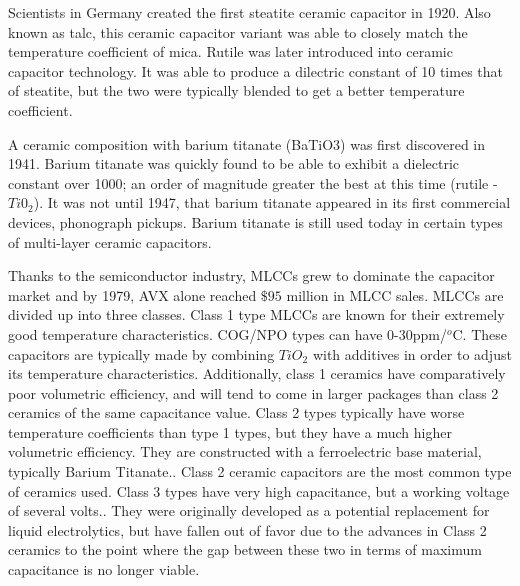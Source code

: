 Scientists in Germany created the first steatite ceramic capacitor in 1920. \cite[Ch 3 Sec II]{cerMaterials} \cite{cerDie} Also known as talc, this ceramic capacitor variant was able to closely match the temperature coefficient of mica.\cite{steatite_hf} Rutile was later introduced into ceramic capacitor technology. It was able to produce a dilectric constant of 10 times that of steatite, but the two were typically blended to get a better temperature coefficient. 

A ceramic composition with barium titanate (BaTiO3) was first discovered in 1941. Barium titanate was quickly found to be able to exhibit a dielectric constant over 1000; an order of magnitude greater the best at this time (rutile - $Ti0_2$). It was not until 1947, that barium titanate appeared in its first commercial devices, phonograph pickups.\cite{piezCer}\cite{hist_cerFilt}\cite[Ch 3 Sec III]{cerMaterials} Barium titanate is still used today in certain types of multi-layer ceramic capacitors.

Thanks to the semiconductor industry, MLCCs grew to dominate the capacitor market and by 1979, AVX alone reached $\$95$ million in MLCC sales.\cite{avx_hist}
MLCCs are divided up into three classes. Class 1 type MLCCs are known for their extremely good temperature characteristics. COG/NPO types can have 0-30ppm/$^o$C. These capacitors are typically made by combining $TiO_2$ with additives in order to adjust its temperature characteristics\cite{intro_cerCaps}. Additionally, class 1 ceramics have comparatively poor volumetric efficiency, and will tend to come in larger packages than class 2 ceramics of the same capacitance value. Class 2 types typically have worse temperature coefficients than type 1 types, but they have a much higher volumetric efficiency. They are constructed with a ferroelectric base material, typically Barium Titanate.\cite{intro_cerCaps}. Class 2 ceramic capacitors are the most common type of ceramics used. Class 3 types have very high capacitance, but a working voltage of several volts.\cite{hist_cerFilt}\cite[Ch 3 Sec VI]{cerMaterials}\cite{atCer_tempco}. They were originally developed as a potential replacement for liquid electrolytics, but have fallen out of favor due to the advances in Class 2 ceramics to the point where the gap between these two in terms of maximum capacitance is no longer viable\cite{wiki_cer}.

